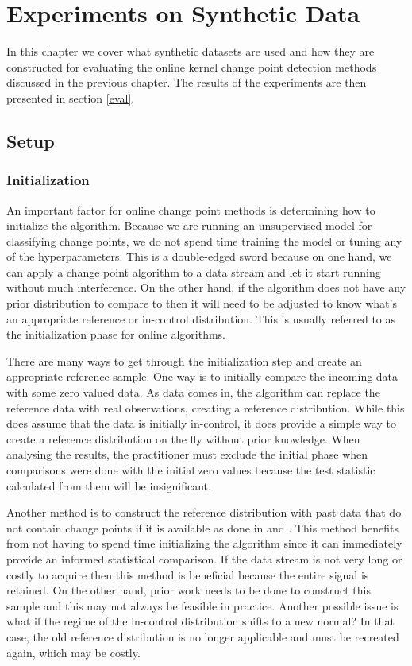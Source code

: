 \chapter{Experiments on Synthetic Data}
In this chapter we cover what synthetic datasets are used and how they are constructed for evaluating the online kernel change point detection methods discussed in the previous chapter. The results of the experiments are then presented in section \ref{eval}.

\section{Setup}
\label{experiments}
\subsection{Initialization}
An important factor for online change point methods is determining how to initialize the algorithm. Because we are running an unsupervised model for classifying change points, we do not spend time training the model or tuning any of the hyperparameters. This is a double-edged sword because on one hand, we can apply a change point algorithm to a data stream and let it start running without much interference. On the other hand, if the algorithm does not have any prior distribution to compare to then it will need to be adjusted to know what's an appropriate reference or in-control distribution. This is usually referred to as the initialization phase for online algorithms.

There are many ways to get through the initialization step and create an appropriate reference sample. One way is to initially compare the incoming data with some zero valued data. As data comes in, the algorithm can replace the reference data with real observations, creating a reference distribution. While this does assume that the data is initially in-control, it does provide a simple way to create a reference distribution on the fly without prior knowledge. When analysing the results, the practitioner must exclude the initial phase when comparisons were done with the initial zero values because the test statistic calculated from them will be insignificant. 

Another method is to construct the reference distribution with past data that do not contain change points if it is available as done in \cite{li2015m} and \cite{flynn2019change}. This method benefits from not having to spend time initializing the algorithm since it can immediately provide an informed statistical comparison. If the data stream is not very long or costly to acquire then this method is beneficial because the entire signal is retained.  On the other hand, prior work needs to be done to construct this sample and this may not always be feasible in practice. Another possible issue is what if the regime of the in-control distribution shifts to a new normal? In that case, the old reference distribution is no longer applicable and must be recreated again, which may be costly. 

